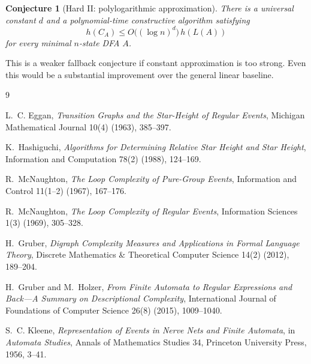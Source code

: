 \documentclass[11pt]{article}
\newtheorem{conjecture}{Conjecture}
\begin{document}
\begin{conjecture}[Hard II: polylogarithmic approximation]
There is a universal constant $d$ and a polynomial-time constructive
algorithm satisfying
\[
 h(C_A)
 \leq
 O\bigl((\log n)^d\bigr)\,h(L(A))
\]
for every minimal $n$-state DFA $A$.
\end{conjecture}

This is a weaker fallback conjecture if constant approximation is too strong.
Even this would be a substantial improvement over the general linear
baseline.


\begin{thebibliography}{9}

L.~C. Eggan,
\emph{Transition Graphs and the Star-Height of Regular Events},
Michigan Mathematical Journal 10(4) (1963), 385--397.

K.~Hashiguchi,
\emph{Algorithms for Determining Relative Star Height and Star Height},
Information and Computation 78(2) (1988), 124--169.

R.~McNaughton,
\emph{The Loop Complexity of Pure-Group Events},
Information and Control 11(1--2) (1967), 167--176.

R.~McNaughton,
\emph{The Loop Complexity of Regular Events},
Information Sciences 1(3) (1969), 305--328.

H.~Gruber,
\emph{Digraph Complexity Measures and Applications in Formal Language
Theory},
Discrete Mathematics \& Theoretical Computer Science 14(2) (2012),
189--204.

H.~Gruber and M.~Holzer,
\emph{From Finite Automata to Regular Expressions and Back---A Summary on
Descriptional Complexity},
International Journal of Foundations of Computer Science 26(8) (2015),
1009--1040.

S.~C. Kleene,
\emph{Representation of Events in Nerve Nets and Finite Automata},
in \emph{Automata Studies}, Annals of Mathematics Studies 34,
Princeton University Press, 1956, 3--41.

\end{thebibliography}
\end{document}

